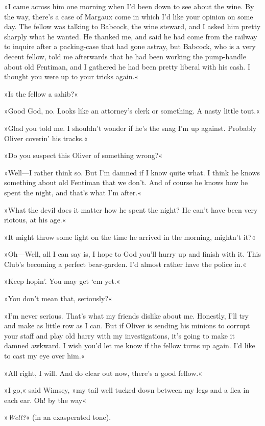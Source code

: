 »I came across him one morning when I'd been down to see about the wine. By the way, there's a case of Margaux come in which I'd like your opinion on some day. The fellow was talking to Babcock, the wine steward, and I asked him pretty sharply what he wanted. He thanked me, and said he had come from the railway to inquire after a packing-case that had gone astray, but Babcock, who is a very decent fellow, told me afterwards that he had been working the pump-handle about old Fentiman, and I gathered he had been pretty liberal with his cash. I thought you were up to your tricks again.«

»Is the fellow a sahib?«

»Good God, no. Looks like an attorney's clerk or something. A nasty little tout.«

»Glad you told me. I shouldn't wonder if he's the snag I'm up against. Probably Oliver coverin' his tracks.«

»Do you suspect this Oliver of something wrong?«

»Well—I rather think so. But I'm damned if I know quite what. I think he knows something about old Fentiman that we don't. And of course he knows how he spent the night, and that's what I'm after.«

»What the devil does it matter how he spent the night? He can't have been very riotous, at his age.«

»It might throw some light on the time he arrived in the morning, mightn't it?«

»Oh—Well, all I can say is, I hope to God you'll hurry up and finish with it. This Club's becoming a perfect bear-garden. I'd almost rather have the police in.«

»Keep hopin'. You may get `em yet.«

»You don't mean that, seriously?«

»I'm never serious. That's what my friends dislike about me. Honestly, I'll try and make as little row as I can. But if Oliver is sending his minions to corrupt your staff and play old harry with my investigations, it's going to make it damned awkward. I wish you'd let me know if the fellow turns up again. I'd like to cast my eye over him.«

»All right, I will. And do clear out now, there's a good fellow.«

»I go,« said Wimsey, »my tail well tucked down between my legs and a flea in each ear. Oh! by the way\longdash«

»\textit{Well?}« (in an exasperated tone).

